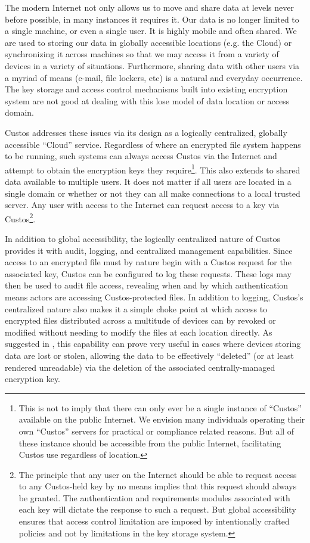 The modern Internet not only allows us to move and share data at
levels never before possible, in many instances it requires it. Our
data is no longer limited to a single machine, or even a single
user. It is highly mobile and often shared. We are used to storing our
data in globally accessible locations (e.g. the Cloud) or
synchronizing it across machines so that we may access it from a
variety of devices in a variety of situations. Furthermore, sharing
data with other users via a myriad of means (e-mail, file lockers,
etc) is a natural and everyday occurrence. The key storage and access
control mechanisms built into existing encryption system are not good
at dealing with this lose model of data location or access domain.

Custos addresses these issues via its design as a logically
centralized, globally accessible ``Cloud'' service. Regardless of
where an encrypted file system happens to be running, such systems can
always access Custos via the Internet and attempt to obtain the
encryption keys they require\footnote{This is not to imply that there
  can only ever be a single instance of ``Custos'' available on the
  public Internet. We envision many individuals operating their own
  ``Custos'' servers for practical or compliance related reasons. But
  all of these instance should be accessible from the public Internet,
  facilitating Custos use regardless of location.}. This also extends
to shared data available to multiple users. It does not matter if all
users are located in a single domain or whether or not they can all
make connections to a local trusted server. Any user with access to
the Internet can request access to a key via Custos\footnote{The
  principle that any user on the Internet should be able to request
  access to any Custos-held key by no means implies that this request
  should always be granted. The authentication and requirements
  modules associated with each key will dictate the response to such a
  request. But global accessibility ensures that access control
  limitation are imposed by intentionally crafted policies and not by
  limitations in the key storage system.}.

In addition to global accessibility, the logically centralized nature
of Custos provides it with audit, logging, and centralized management
capabilities. Since access to an encrypted file must by nature begin
with a Custos request for the associated key, Custos can be configured
to log these requests. These logs may then be used to audit file
access, revealing when and by which authentication means actors are
accessing Custos-protected files. In addition to logging, Custos's
centralized nature also makes it a simple choke point at which access
to encrypted files distributed across a multitude of devices can by
revoked or modified without needing to modify the files at each
location directly. As suggested in \cite{Geambasu2011}, this
capability can prove very useful in cases where devices storing data
are lost or stolen, allowing the data to be effectively ``deleted''
(or at least rendered unreadable) via the deletion of the associated
centrally-managed encryption key.

